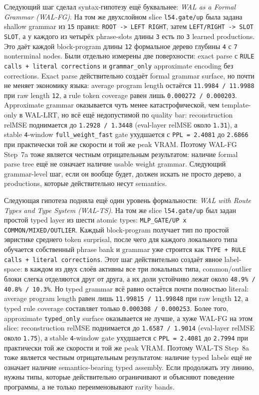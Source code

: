 \begin{itemize}[leftmargin=1.5em]
Следующий шаг сделал syntax-гипотезу ещё буквальнее:
\emph{WAL as a Formal Grammar (WAL-FG)}. На том же двухслойном slice
\texttt{l54.gate/up} была задана shallow grammar из \texttt{15} правил:
\texttt{ROOT -> LEFT RIGHT}, затем \texttt{LEFT/RIGHT -> SLOT SLOT}, а у
каждого из четырёх phrase-slots длины \texttt{3} есть по \texttt{3} learned
productions. Это даёт каждой block-program длины \texttt{12} формальное дерево
глубины \texttt{4} с \texttt{7} nonterminal nodes. Были отдельно измерены две
поверхности: exact parse с \texttt{RULE calls + literal corrections} и
\texttt{grammar\_only} approximate encoding без corrections. Exact parse
действительно создаёт formal grammar surface, но почти не меняет экономику
языка: average program length остаётся \texttt{11.9984 / 11.9988} при raw
length \texttt{12}, а rule token coverage равен лишь
\texttt{0.000272 / 0.000203}. Approximate grammar оказывается чуть менее
катастрофической, чем template-only в WAL-LRT, но всё ещё недопустимой по
quality bar: reconstruction relMSE поднимается до
\texttt{1.2928 / 1.3448} (eval-layer relMSE около \texttt{1.31}), а stable
\texttt{4}-window \texttt{full\_weight\_fast} gate ухудшается с
\texttt{PPL = 2.4081} до \texttt{2.6866} при практически той же скорости и
той же peak VRAM. Поэтому WAL-FG Step~7a тоже является честным отрицательным
результатом: наличие formal parse tree ещё не означает наличие usable weight
grammar. Следующий grammar-level шаг, если он вообще будет, должен искать не
просто дерево, а productions, которые действительно несут semantics.

Следующая гипотеза подняла ещё один уровень формальности:
\emph{WAL with Route Types and Type System (WAL-TS)}. На том же slice
\texttt{l54.gate/up} был задан простой typed layer из шести atomic types:
\texttt{MLP\_GATE/UP x COMMON/MIXED/OUTLIER}. Каждый block-program получает
тип по простой эвристике среднего token surprisal, после чего для каждого
локального типа обучается собственный phrase bank и grammar уже строится как
\texttt{TYPE + RULE calls + literal corrections}. Этот шаг действительно
создаёт явное label-space: в каждом из двух слоёв активны все три локальных
типа, common/outlier блоки слегка отделяются друг от друга, а их доли устойчиво
лежат около \texttt{48.9\% / 40.8\% / 10.3\%}. Но typed grammar всё равно
остаётся почти полностью literal: average program length равен лишь
\texttt{11.99815 / 11.99848} при raw length \texttt{12}, а typed rule coverage
составляет только \texttt{0.000308 / 0.000253}. Более того, approximate
\texttt{typed\_only} surface оказывается не лучше, а хуже WAL-FG на этом
slice: reconstruction relMSE поднимается до \texttt{1.6587 / 1.9014}
(eval-layer relMSE около \texttt{1.75}), а stable \texttt{4}-window gate
ухудшается с \texttt{PPL = 2.4081} до \texttt{2.7994} при практически той же
скорости и той же peak VRAM. Поэтому WAL-TS Step~8a тоже является честным
отрицательным результатом: наличие typed labels ещё не означает наличие
semantics-bearing typed assembly. Если продолжать эту линию, нужны типы,
которые действительно ограничивают и объясняют поведение программы, а не
только переименовывают rarity bands.


\end{itemize}
